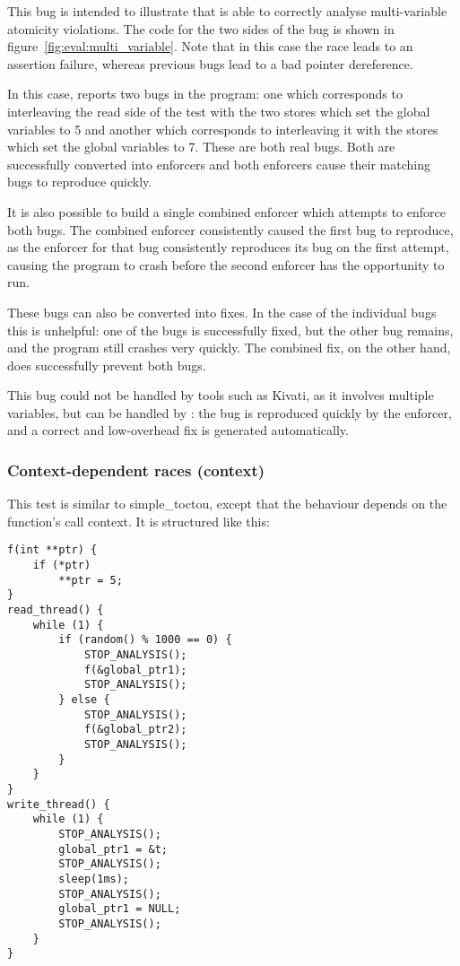 This bug is intended to illustrate that {\technique} is able to
correctly analyse multi-variable atomicity violations.  The code for
the two sides of the bug is shown in
figure~\ref{fig:eval:multi_variable}.  Note that in this case the race
leads to an assertion failure, whereas previous bugs lead to a bad
pointer dereference.

In this case, {\technique} reports two bugs in the program: one which
corresponds to interleaving the read side of the test with the two
stores which set the global variables to 5 and another which
corresponds to interleaving it with the stores which set the global
variables to 7.  These are both real bugs.  Both are successfully
converted into enforcers and both enforcers cause their matching bugs
to reproduce quickly.

It is also possible to build a single combined enforcer which attempts
to enforce both bugs.  The combined enforcer consistently caused the
first bug to reproduce, as the enforcer for that bug consistently
reproduces its bug on the first attempt, causing the program to crash
before the second enforcer has the opportunity to run.

These bugs can also be converted into fixes.  In the case of the
individual bugs this is unhelpful: one of the bugs is successfully
fixed, but the other bug remains, and the program still crashes very
quickly.  The combined fix, on the other hand, does successfully
prevent both bugs.

This bug could not be handled by tools such as Kivati\needCite{}, as
it involves multiple variables, but can be handled by {\technique}:
the bug is reproduced quickly by the enforcer, and a correct and
low-overhead fix is generated automatically.


\subsubsection{Context-dependent races (context)}

This test is similar to simple\_toctou, except that the behaviour
depends on the function's call context.  It is structured like this:

\begin{verbatim}
f(int **ptr) {
    if (*ptr)
        **ptr = 5;   
}
read_thread() {
    while (1) {
        if (random() % 1000 == 0) {
            STOP_ANALYSIS();
            f(&global_ptr1);
            STOP_ANALYSIS();
        } else {
            STOP_ANALYSIS();
            f(&global_ptr2);
            STOP_ANALYSIS();
        }
    }
}        
write_thread() {
    while (1) {
        STOP_ANALYSIS();
        global_ptr1 = &t;
        STOP_ANALYSIS();
        sleep(1ms);
        STOP_ANALYSIS();
        global_ptr1 = NULL;
        STOP_ANALYSIS();
    }
}
\end{verbatim}

